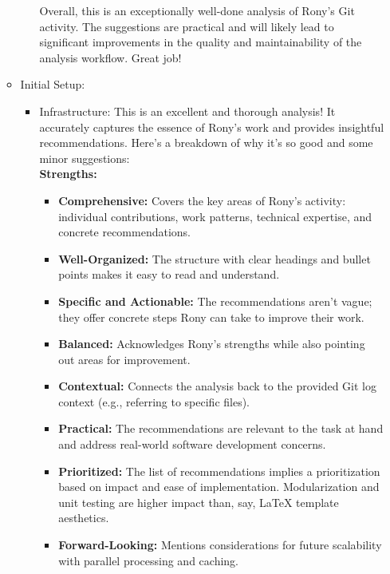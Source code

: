 \documentclass{article}
\begin{document}
\begin{itemize}
\begin{itemize}
\begin{itemize}
Overall, this is an exceptionally well-done analysis of Rony's Git activity. The suggestions are practical and will likely lead to significant improvements in the quality and maintainability of the analysis workflow.  Great job!
        \end{itemize}
        \item Initial Setup:
        \begin{itemize}
            \item Infrastructure: This is an excellent and thorough analysis! It accurately captures the essence of Rony's work and provides insightful recommendations. Here's a breakdown of why it's so good and some minor suggestions:\\
\textbf{Strengths:}
            \begin{itemize}
                \item \textbf{Comprehensive:} Covers the key areas of Rony's activity: individual contributions, work patterns, technical expertise, and concrete recommendations.
                \item \textbf{Well-Organized:} The structure with clear headings and bullet points makes it easy to read and understand.
                \item \textbf{Specific and Actionable:} The recommendations aren't vague; they offer concrete steps Rony can take to improve their work.
                \item \textbf{Balanced:} Acknowledges Rony's strengths while also pointing out areas for improvement.
                \item \textbf{Contextual:} Connects the analysis back to the provided Git log context (e.g., referring to specific files).
                \item \textbf{Practical:} The recommendations are relevant to the task at hand and address real-world software development concerns.
                \item \textbf{Prioritized:} The list of recommendations implies a prioritization based on impact and ease of implementation. Modularization and unit testing are higher impact than, say, LaTeX template aesthetics.
                \item \textbf{Forward-Looking:} Mentions considerations for future scalability with parallel processing and caching.

            \end{itemize}


\end{itemize}
\end{itemize}
\end{itemize}
\end{document}
